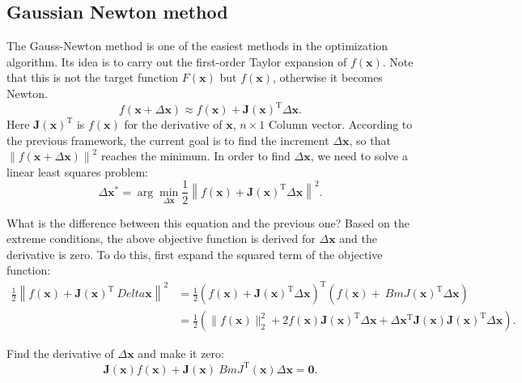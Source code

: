 \subsection{Gaussian Newton method}
The Gauss-Newton method is one of the easiest methods in the optimization algorithm. Its idea is to carry out the first-order Taylor expansion of $f(\bm{x})$. Note that this is not the target function $F(\bm{x})$ but $f(\bm{x})$, otherwise it becomes Newton.
\begin{equation}
\label{eq:approximation}
f\left( {\bm{x} + \Delta \bm{x}} \right) \approx f\left( \bm{x} \right) + \bm{J} \left( \bm{x} \right)^\mathrm{T} \Delta \bm{x}.
\end{equation}
Here $\bm{J}(\bm{x})^\mathrm{T}$ is $f(\bm{x})$ for the derivative of $\bm{x}$, $n \times 1$ Column vector. According to the previous framework, the current goal is to find the increment $\Delta \bm{x}$, so that $\left\| {f\left( \bm{x} + \Delta \bm{x} \right)} \right \|^2$ reaches the minimum. In order to find $\Delta \bm{x}$, we need to solve a linear least squares problem:
\begin{equation}
\Delta \bm{x}^* = \arg \mathop {\min }\limits_{\Delta \bm{x}} \frac{1}{2}{\left\| {f\left( \bm{ x} \right) + \bm{J} \left( \bm{x} \right)^\mathrm{T} \Delta \bm{x} } \right\|^2}.
\end{equation}

What is the difference between this equation and the previous one? Based on the extreme conditions, the above objective function is derived for $\Delta \bm{x}$ and the derivative is zero. To do this, first expand the squared term of the objective function:
\begin{align*}
\frac{1}{2}{\left\| {f\left( \bm{x} \right) + \bm{J} \left( \bm{x} \right)^\mathrm{T} \ Delta \bm{x}} \right\|^2} &= \frac{1}{2}{\left( {f\left( \bm{x} \right) + \bm{J}\left( \bm{x} \right)^\mathrm{T} \Delta \bm{x}} \right)^\mathrm{T}}\left( {f\left( \bm{x} \right) + \ Bm{J} \left( \bm{x} \right)^\mathrm{T} \Delta \bm{x}} \right)\\
&= \frac{1}{2}\left( \| f{{\left( \bm{x} \right)}\|^2_2 + 2 f\left( \bm{x} \right) \bm {J} {{\left( \bm{x} \right)}}^\mathrm{T} \Delta \bm{x} + \Delta { \bm{x}^\mathrm{T}}{\bm {J} (\bm{x})} \bm{J}(\bm{x})^\mathrm{T} \Delta \bm{x}} \right).
\end{align*}

Find the derivative of $\Delta \bm{x}$ and make it zero:
\begin{displaymath}
\bm{J} {\left( \bm{x} \right)}f\left( \bm{x} \right) + \bm{J} {\left( \bm{x} \right)} \ Bm{J}^\mathrm{T} \left( \bm{x} \right)\Delta \bm{x} = \bm{0}.
\end{displaymath}

